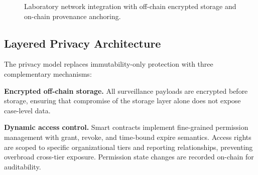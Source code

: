 \begin{figure}[!ht]
\centering
{}
\caption{Laboratory network integration with off-chain encrypted storage and on-chain provenance anchoring.}\label{fig:laboratory}
\end{figure}

%
%
%
%
%
%

\subsection{Layered Privacy Architecture}\label{subsec:privacy}

The privacy model replaces immutability-only protection with three complementary mechanisms:

\textbf{Encrypted off-chain storage.} All surveillance payloads are encrypted before storage, ensuring that compromise of the storage layer alone does not expose case-level data.

\textbf{Dynamic access control.} Smart contracts implement fine-grained permission management with grant, revoke, and time-bound expire semantics. Access rights are scoped to specific organizational tiers and reporting relationships, preventing overbroad cross-tier exposure. Permission state changes are recorded on-chain for auditability.

